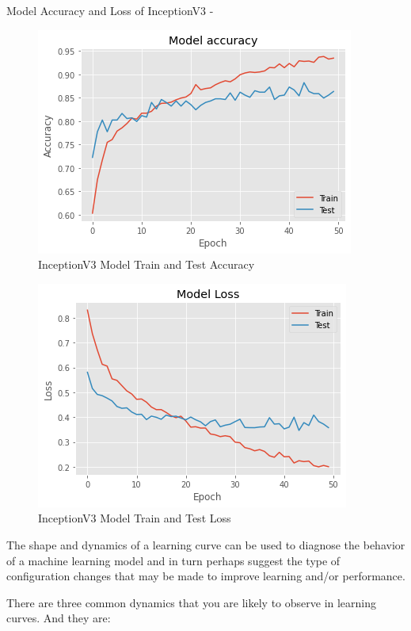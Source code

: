 \newpage
\vspace{5mm}
Model Accuracy and Loss of InceptionV3 -
\vspace{5mm}
\begin{figure}[hbt!]
\centering
\includegraphics[scale=1]{images/fig-33.png}
\caption{InceptionV3 Model Train and Test Accuracy}
\label{fig:x InceptionV3 Model Train and Test Accuracy}
\end{figure}

\vspace{5mm}
\begin{figure}[hbt!]
\centering
\includegraphics[scale=1]{images/fig-34.png}
\caption{InceptionV3 Model Train and Test Loss}
\label{fig:x InceptionV3 Model Train and Test Loss}
\end{figure}

The shape and dynamics of a learning curve can be used to diagnose the behavior of a machine learning model and in turn perhaps suggest the type of configuration changes that may be made to improve learning and/or performance.

\vspace{5mm}
There are three common dynamics that you are likely to observe in learning curves. And they are:

